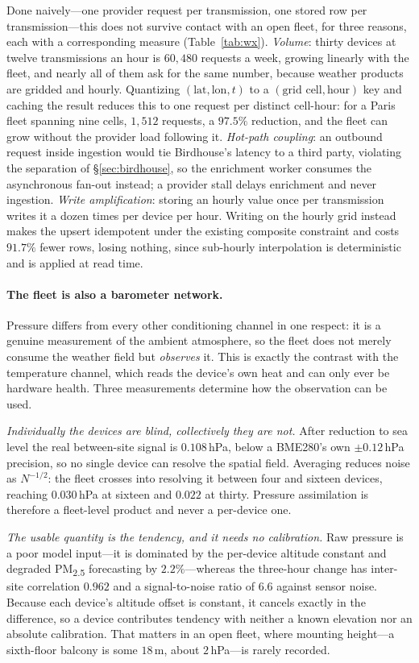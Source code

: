 \documentclass[10pt]{article}
\begin{document}
Done naively---one provider request per transmission, one stored row per
transmission---this does not survive contact with an open fleet, for three reasons,
each with a corresponding measure (Table~\ref{tab:wx}).
\emph{Volume}: thirty devices at twelve transmissions an hour is $60{,}480$ requests
a week, growing linearly with the fleet, and nearly all of them ask for the same
number, because weather products are gridded and hourly. Quantizing
$(\text{lat},\text{lon},t)$ to a $(\text{grid cell},\text{hour})$ key and caching
the result reduces this to one request per distinct cell-hour: for a Paris fleet
spanning nine cells, $1{,}512$ requests, a $97.5\%$ reduction, and the fleet can
grow without the provider load following it.
\emph{Hot-path coupling}: an outbound request inside ingestion would tie Birdhouse's
latency to a third party, violating the separation of \S\ref{sec:birdhouse}, so the
enrichment worker consumes the asynchronous fan-out instead; a provider stall delays
enrichment and never ingestion.
\emph{Write amplification}: storing an hourly value once per transmission writes it
a dozen times per device per hour. Writing on the hourly grid instead makes the
upsert idempotent under the existing composite constraint and costs $91.7\%$ fewer
rows, losing nothing, since sub-hourly interpolation is deterministic and is
applied at read time.

\paragraph{The fleet is also a barometer network.}
Pressure differs from every other conditioning channel in one respect: it is a
genuine measurement of the ambient atmosphere, so the fleet does not merely consume
the weather field but \emph{observes} it. This is exactly the contrast with the
temperature channel, which reads the device's own heat and can only ever be
hardware health. Three measurements determine how the observation can be used.

\emph{Individually the devices are blind, collectively they are not.} After
reduction to sea level the real between-site signal is $0.108$\,hPa, below a
BME280's own $\pm0.12$\,hPa precision, so no single device can resolve the spatial
field. Averaging reduces noise as $N^{-1/2}$: the fleet crosses into resolving it
between four and sixteen devices, reaching $0.030$\,hPa at sixteen and $0.022$ at
thirty. Pressure assimilation is therefore a fleet-level product and never a
per-device one.

\emph{The usable quantity is the tendency, and it needs no calibration.} Raw
pressure is a poor model input---it is dominated by the per-device altitude
constant and degraded PM\textsubscript{2.5} forecasting by $2.2\%$---whereas the
three-hour change has inter-site correlation $0.962$ and a signal-to-noise ratio of
$6.6$ against sensor noise. Because each device's altitude offset is constant, it
cancels exactly in the difference, so a device contributes tendency with neither a
known elevation nor an absolute calibration. That matters in an open fleet, where
mounting height---a sixth-floor balcony is some $18$\,m, about $2$\,hPa---is rarely
recorded.
\end{document}
